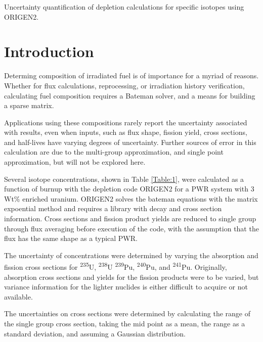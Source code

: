 \documentclass[11pt,notitlepage]{article}
\newcommand{\tss}{\textsuperscript}
\newcommand\tab[1][0.6cm]{\hspace*{#1}}
\begin{document}
\vspace*{0.5cm}


\vspace{1cm}
Uncertainty quantification of depletion calculations
for specific isotopes using ORIGEN2.

 
\section{Introduction}

\tab
Determing composition of irradiated fuel is of importance
for a myriad of reasons. Whether for flux calculations,
reprocessing, or irradiation history verification,
calculating fuel composition requires a Bateman solver,
and a means for building a sparse matrix.

Applications using these compositions rarely report the
uncertainty associated with results, even when inputs,
such as flux shape, fission yield, cross sections,
and half-lives have varying degrees of uncertainty. Further
sources of error in this calculation are due to the multi-group
approximation, and single point approximation,
but will not be explored here.

Several isotope concentrations, shown in Table \ref{Table:1},
were calculated as a function of burnup
with the depletion code ORIGEN2 for a PWR system with 3 Wt\%
enriched uranium. ORIGEN2 solves the bateman equations with
the matrix expoential method and requires a library
with decay and cross section information. Cross sections and
fission product yields are reduced to single group through flux
averaging before execution of the code,
with the assumption that the flux has the same shape as a typical PWR.

The uncertainty of concentrations were determined by varying the
absorption and fission cross sections for \tss{235}U, \tss{238}U
\tss{239}Pu, \tss{240}Pu, and \tss{241}Pu. Originally, absorption
cross sections and yields for the fission products were to be
varied, but
variance information for the lighter nuclides is either
difficult to acquire or not available.

The uncertainties on cross sections
were determined by calculating the range of the single group
cross section, taking the mid point as a mean, the range as
a standard deviation, and assuming a Gaussian distribution.
\end{document}
